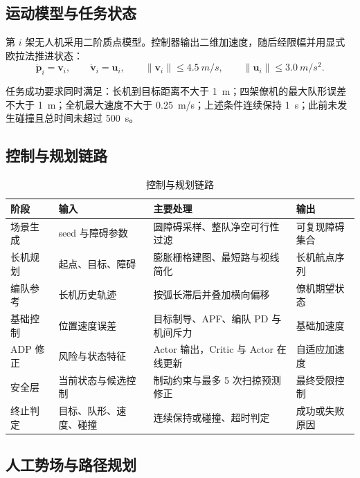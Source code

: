 \documentclass[UTF8,a4paper,12pt,fontset=windows]{ctexart}
\begin{document}
\subsection{运动模型与任务状态}

第 $i$ 架无人机采用二阶质点模型。控制器输出二维加速度，随后经限幅并用显式欧拉法推进状态：
\begin{equation}
\dot{\bm p}_i=\bm v_i,\qquad
\dot{\bm v}_i=\bm u_i,\qquad
\lVert\bm v_i\rVert\leq \SI{4.5}{m/s},\qquad
\lVert\bm u_i\rVert\leq \SI{3.0}{m/s^2}.
\end{equation}

任务成功要求同时满足：长机到目标距离不大于 \SI{1}{m}；四架僚机的最大队形误差不大于 \SI{1}{m}；全机最大速度不大于 \SI{0.25}{m/s}；上述条件连续保持 \SI{1}{s}；此前未发生碰撞且总时间未超过 \SI{500}{s}。

\subsection{控制与规划链路}

\begin{table}[H]
\centering
\caption{控制与规划链路}
\label{tab:pipeline}
\small
\begin{tabularx}{\textwidth}{@{}C{2.0cm}C{3.0cm}YC{2.7cm}@{}}
\toprule
阶段 & 输入 & 主要处理 & 输出 \\
\midrule
场景生成 & seed 与障碍参数 & 圆障碍采样、整队净空可行性过滤 & 可复现障碍集合 \\
长机规划 & 起点、目标、障碍 & 膨胀栅格建图、最短路与视线简化 & 长机航点序列 \\
编队参考 & 长机历史轨迹 & 按弧长滞后并叠加横向偏移 & 僚机期望状态 \\
基础控制 & 位置速度误差 & 目标制导、APF、编队 PD 与机间斥力 & 基础加速度 \\
ADP 修正 & 风险与状态特征 & Actor 输出，Critic 与 Actor 在线更新 & 自适应加速度 \\
安全层 & 当前状态与候选控制 & 制动约束与最多 5 次扫掠预测修正 & 最终受限控制 \\
终止判定 & 目标、队形、速度、碰撞 & 连续保持或碰撞、超时判定 & 成功或失败原因 \\
\bottomrule
\end{tabularx}
\end{table}

\subsection{人工势场与路径规划}
\end{document}
